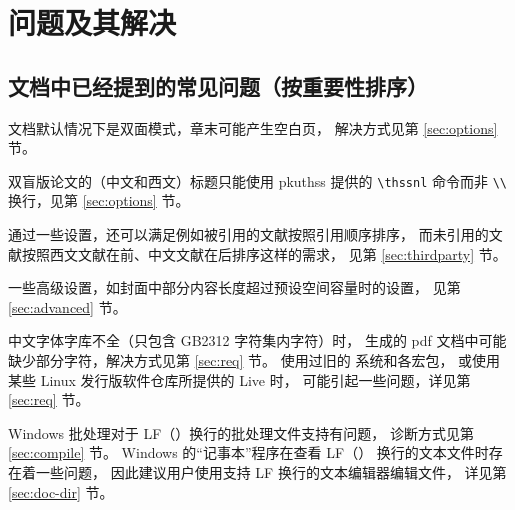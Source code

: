 %
%
%
%

\chapter{问题及其解决}
\section{文档中已经提到的常见问题（按重要性排序）}

文档默认情况下是双面模式，章末可能产生空白页，
解决方式见第 \ref{sec:options} 节。

双盲版论文的（中文和西文）标题只能使用 pkuthss 提供的
\verb|\thssnl| 命令而非 \verb|\\| 换行，见第 \ref{sec:options} 节。

通过一些设置，还可以满足例如被引用的文献按照引用顺序排序，
而未引用的文献按照西文文献在前、中文文献在后排序这样的需求，
见第 \ref{sec:thirdparty} 节。

一些高级设置，如封面中部分内容长度超过预设空间容量时的设置，
见第 \ref{sec:advanced} 节。

中文字体字库不全（只包含 GB2312 字符集内字符）时，
生成的 pdf 文档中可能缺少部分字符，解决方式见第 \ref{sec:req} 节。
使用过旧的  系统和各宏包，
或使用某些 Linux 发行版软件仓库所提供的  Live 时，
可能引起一些问题，详见第 \ref{sec:req} 节。

Windows 批处理对于 LF（\texttt{\string\n}）换行的批处理文件支持有问题，
诊断方式见第 \ref{sec:compile} 节。
Windows 的“记事本”程序在查看 LF（\texttt{\string\n}）
换行的文本文件时存在着一些问题，
因此建议用户使用支持 LF 换行的文本编辑器编辑文件，
详见第 \ref{sec:doc-dir} 节。

